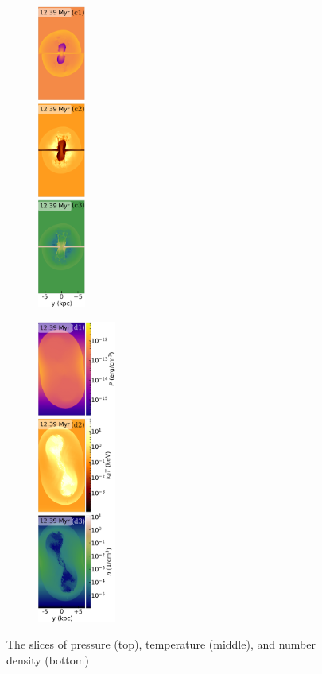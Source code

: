 \documentclass[fleqn,usenatbib,useAMS]{mnras}
\begin{document}
\begin{figure}
      \hspace{-2pt}%
      \begin{subfigure}[b]{0.2\linewidth}%
         \includegraphics[height=10cm]{figures/fig__jetI5+ismSeed3-45deg-c}%
         \caption{}%
         \label{fig__jetI5+ismSeed3-45deg-c}%
      \end{subfigure}%
      \hspace{-2pt}%
      \begin{subfigure}[b]{0.2\linewidth}%
         \includegraphics[height=10cm]{figures/fig__jetI5+ismSeed3-45deg-d}%
         \caption{}%
         \label{fig__jetI5+ismSeed3-45deg-d}%
     \end{subfigure}%
      \caption{
             The slices of pressure (top), temperature (middle), and number density (bottom)\
}
\end{figure}
\end{document}
